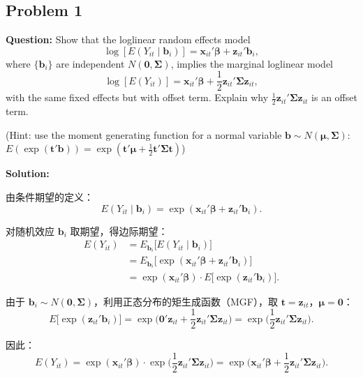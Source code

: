 \subsection{Problem 1}

\textbf{Question:} Show that the loglinear random effects model
\[
  \log[E(Y_{it}\mid \boldsymbol{b}_i)] = \boldsymbol{x}_{it}'\boldsymbol{\beta} + \boldsymbol{z}_{it}'\boldsymbol{b}_i,
\]
where $\{\boldsymbol{b}_i\}$ are independent $N(\boldsymbol{0}, \boldsymbol{\Sigma})$, implies the marginal loglinear model
\[
  \log[E(Y_{it})] = \boldsymbol{x}_{it}'\boldsymbol{\beta} + \frac{1}{2}\boldsymbol{z}_{it}'\boldsymbol{\Sigma}\boldsymbol{z}_{it},
\]
with the same fixed effects but with offset term. Explain why $\frac{1}{2}\boldsymbol{z}_{it}'\boldsymbol{\Sigma}\boldsymbol{z}_{it}$ is an offset term.

(Hint: use the moment generating function for a normal variable $\boldsymbol{b} \sim N(\boldsymbol{\mu}, \boldsymbol{\Sigma})$: $E(\exp(\boldsymbol{t}'\boldsymbol{b})) = \exp(\boldsymbol{t}'\boldsymbol{\mu} + \frac{1}{2}\boldsymbol{t}'\boldsymbol{\Sigma}\boldsymbol{t})$)

\bigskip
\textbf{Solution:}

由条件期望的定义：
\[
  E(Y_{it}\mid \boldsymbol{b}_i) = \exp(\boldsymbol{x}_{it}'\boldsymbol{\beta} + \boldsymbol{z}_{it}'\boldsymbol{b}_i).
\]

对随机效应 $\boldsymbol{b}_i$ 取期望，得边际期望：
\begin{align*}
  E(Y_{it}) &= E_{\boldsymbol{b}_i}\big[E(Y_{it}\mid \boldsymbol{b}_i)\big] \\
  &= E_{\boldsymbol{b}_i}\big[\exp(\boldsymbol{x}_{it}'\boldsymbol{\beta} + \boldsymbol{z}_{it}'\boldsymbol{b}_i)\big] \\
  &= \exp(\boldsymbol{x}_{it}'\boldsymbol{\beta}) \cdot E\big[\exp(\boldsymbol{z}_{it}'\boldsymbol{b}_i)\big].
\end{align*}

由于 $\boldsymbol{b}_i \sim N(\boldsymbol{0}, \boldsymbol{\Sigma})$，利用正态分布的矩生成函数（MGF），取 $\boldsymbol{t} = \boldsymbol{z}_{it}$，$\boldsymbol{\mu} = \boldsymbol{0}$：
\[
  E\big[\exp(\boldsymbol{z}_{it}'\boldsymbol{b}_i)\big] = \exp\!\Big(\boldsymbol{0}'\boldsymbol{z}_{it} + \frac{1}{2}\boldsymbol{z}_{it}'\boldsymbol{\Sigma}\boldsymbol{z}_{it}\Big) = \exp\!\Big(\frac{1}{2}\boldsymbol{z}_{it}'\boldsymbol{\Sigma}\boldsymbol{z}_{it}\Big).
\]

因此：
\[
  E(Y_{it}) = \exp(\boldsymbol{x}_{it}'\boldsymbol{\beta}) \cdot \exp\!\Big(\frac{1}{2}\boldsymbol{z}_{it}'\boldsymbol{\Sigma}\boldsymbol{z}_{it}\Big) = \exp\!\Big(\boldsymbol{x}_{it}'\boldsymbol{\beta} + \frac{1}{2}\boldsymbol{z}_{it}'\boldsymbol{\Sigma}\boldsymbol{z}_{it}\Big).
\]

